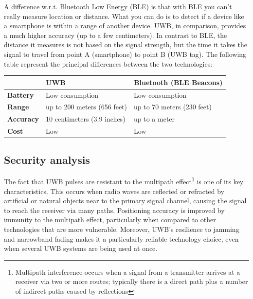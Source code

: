 \documentclass[english]{article}
\begin{document}
A difference w.r.t. Bluetooth Low Energy (BLE) is that with BLE you can’t really measure location or distance. What you can do is to detect if a device like a smartphone is within a range of another device. UWB, in comparison, provides a much higher accuracy (up to a few centimeters). In contrast to BLE, the distance it measures is not based on the signal strength, but the time it takes the signal to travel from point A (smartphone) to point B (UWB tag). The following table represent the principal differences between the two technologies:

\begin{table}[h]
  \begin{tabular}{l|l|l|}
  \cline{2-3}
  {}                               & {\textbf{UWB}}                & { \textbf{Bluetooth (BLE Beacons)}} \\ \hline
  \multicolumn{1}{|l|}{{  \textbf{Battery}}}  & {  Low consumption}             & {  Low consumption}                  \\ \hline
  \multicolumn{1}{|l|}{{  \textbf{Range}}}    & {  up to 200 meters (656 feet)} & {  up to 70 meters (230 feet)}       \\ \hline
  \multicolumn{1}{|l|}{{  \textbf{Accuracy}}} & {  10 centimeters (3.9 inches)} & {  up to a meter}                    \\ \hline
  \multicolumn{1}{|l|}{{  \textbf{Cost}}}     & {  Low}                         & {  Low}                              \\ \hline
  \end{tabular}
  \end{table}

\subsection{Security analysis}
The fact that UWB pulses are resistant to the multipath effect\footnote{Multipath interference occurs when a signal from a transmitter arrives at a receiver via two or more routes; typically there is a direct path plus a number of indirect paths caused by reflections} is one of its key characteristics. This occurs when radio waves are reflected or refracted by artificial or natural objects near to the primary signal channel, causing the signal to reach the receiver via many paths. Positioning accuracy is improved by immunity to the multipath effect, particularly when compared to other technologies that are more vulnerable. Moreover, UWB's resilience to jamming and narrowband fading makes it a particularly reliable technology choice, even when several UWB systems are being used at once.
\end{document}

